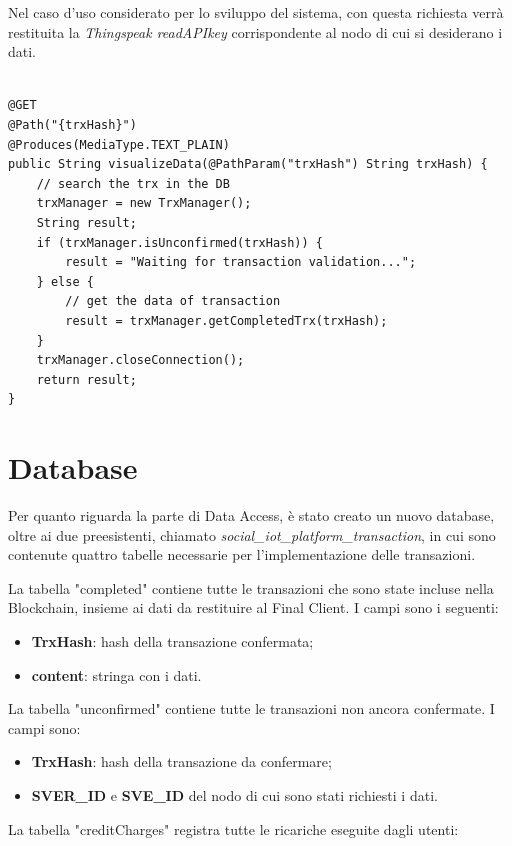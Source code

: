 Nel caso d'uso considerato per lo sviluppo del sistema, con questa richiesta verrà restituita la \textit{Thingspeak readAPIkey} corrispondente al nodo di cui si desiderano i dati.


\begin{lstlisting}[caption={TransactionResource.java},label={restResource},style={c}]

@GET
@Path("{trxHash}")
@Produces(MediaType.TEXT_PLAIN)
public String visualizeData(@PathParam("trxHash") String trxHash) {
    // search the trx in the DB
    trxManager = new TrxManager();
    String result;
    if (trxManager.isUnconfirmed(trxHash)) {
        result = "Waiting for transaction validation...";
    } else {
        // get the data of transaction
        result = trxManager.getCompletedTrx(trxHash);
    }
    trxManager.closeConnection();
    return result;
}
\end{lstlisting}

\section{Database}
\label{c:integr:db}

Per quanto riguarda la parte di Data Access, è stato creato un nuovo database, oltre ai due preesistenti, chiamato \textit{social\_iot\_platform\_transaction}, in cui sono contenute quattro tabelle necessarie per l'implementazione delle transazioni.

La tabella "completed" contiene tutte le transazioni che sono state incluse nella Blockchain, insieme ai dati da restituire al Final Client. I campi sono i seguenti:

\begin{itemize}
    \item \textbf{TrxHash}: hash della transazione confermata;
	\item \textbf{content}: stringa con i dati.
\end{itemize}

La tabella "unconfirmed" contiene tutte le transazioni non ancora confermate. I campi sono:

\begin{itemize}
    \item \textbf{TrxHash}: hash della transazione da confermare;
    \item \textbf{SVER\_ID} e \textbf{SVE\_ID} del nodo di cui sono stati richiesti i dati.
\end{itemize}

La tabella "creditCharges" registra tutte le ricariche eseguite dagli utenti:

